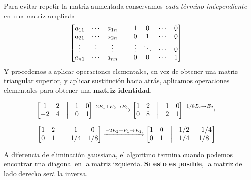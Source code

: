 \documentclass[
]{article}
\begin{document}
Para evitar repetir la matriz aumentada conservamos \emph{cada}
\emph{término} \emph{independiente} en una matriz ampliada \[
  \begin{bmatrix}
        a_{11}   & \cdots   & a_{1n}   &\bigm| & 1       & 0      & \cdots  & 0 \\
        a_{21}   & \cdots   & a_{2n}   &\bigm| & 0       & 1      & \cdots  &  0\\
    \vdots       & \vdots   & \vdots   &\bigm| & \vdots  & \ddots & \cdots  & 0 \\
      a_{n1}  & \cdots      & a_{nn}   &\bigm| & 0       & 0      & \cdots  & 1
  \end{bmatrix}
\] Y procedemos a aplicar operaciones elementales, en vez de obtener una
matriz triangular superior, y aplicar sustitución hacia atrás, aplicamos
operaciones elementales para obtener una \textbf{matriz}
\textbf{identidad}.

\begin{equation*}
  \begin{bmatrix}
        1   & 2 &\bigm| & 1       & 0     \\
        -2  & 4  &\bigm| & 0       & 1     
  \end{bmatrix} 
  \xrightarrow{2E_1+E_2\rightarrow E_2}
  \begin{bmatrix}
        1   & 2  &\bigm| & 1       & 0     \\
        0   & 8  &\bigm| & 2       & 1     \\
  \end{bmatrix} 
  \xrightarrow{1/8E_2\rightarrow E_2}
\end{equation*}

\[
  \begin{bmatrix}
        1   & 2  &\bigm| & 1         & 0     \\
        0   & 1  &\bigm| & 1/4       & 1/8     \\
  \end{bmatrix} 
  \xrightarrow{-2E_2+E_1\rightarrow E_1}
  \begin{bmatrix}
        1   & 0  &\bigm| & 1/2         & -1/4     \\
        0   & 1  &\bigm| & 1/4       & 1/8     \\
  \end{bmatrix} 
\]

A diferencia de eliminación gaussiana, el algoritmo termina cuando
podemos encontrar una diagonal en la matriz izquierda. \textbf{Si}
\textbf{esto} \textbf{es} \textbf{posible}, la matriz del lado derecho
será la inversa.
\end{document}
